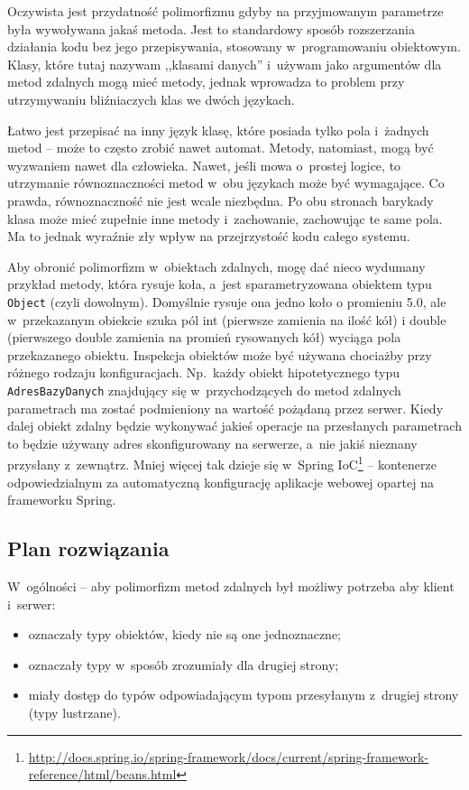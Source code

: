 Oczywista jest przydatność polimorfizmu gdyby na przyjmowanym parametrze była wywoływana jakaś metoda. Jest to standardowy sposób rozszerzania działania kodu bez jego przepisywania, stosowany w~programowaniu obiektowym.
Klasy, które tutaj nazywam ,,klasami danych'' i~używam jako argumentów dla metod zdalnych mogą mieć metody, jednak wprowadza to problem przy utrzymywaniu bliźniaczych klas we dwóch językach.

Łatwo jest przepisać na inny język klasę, które posiada tylko pola i~żadnych metod -- może to często zrobić nawet automat.
Metody, natomiast, mogą być wyzwaniem nawet dla człowieka. Nawet, jeśli mowa o~prostej logice, to utrzymanie równoznaczności metod w~obu językach może być wymagające.
Co prawda, równoznaczność nie jest wcale niezbędna. Po obu stronach barykady klasa może mieć zupełnie inne metody i~zachowanie, zachowując te same pola. Ma to jednak wyraźnie zły wpływ na przejrzystość kodu całego systemu.

Aby obronić polimorfizm w~obiektach zdalnych, mogę dać nieco wydumany przykład metody, która rysuje koła, a~jest sparametryzowana obiektem typu \texttt{Object} (czyli dowolnym). Domyślnie rysuje ona jedno koło o promieniu 5.0, ale w~przekazanym obiekcie szuka pól int (pierwsze zamienia na ilość kół) i double (pierwszego double zamienia na promień rysowanych kół) wyciąga pola przekazanego obiektu.
Inspekcja obiektów może być używana chociażby przy różnego rodzaju konfiguracjach. Np.\ każdy obiekt hipotetycznego typu \texttt{AdresBazyDanych} znajdujący się w~przychodzących do metod zdalnych parametrach ma zostać podmieniony na wartość pożądaną przez serwer. Kiedy dalej obiekt zdalny będzie wykonywać jakieś operacje na przesłanych parametrach to będzie używany adres skonfigurowany na serwerze, a~nie jakiś nieznany przysłany z~zewnątrz.
Mniej więcej tak dzieje się w~Spring IoC\footnote{\url{http://docs.spring.io/spring-framework/docs/current/spring-framework-reference/html/beans.html}} -- kontenerze odpowiedzialnym za automatyczną konfigurację aplikacje webowej opartej na frameworku Spring.

%


\subsection{Plan rozwiązania}
W~ogólności -- aby polimorfizm metod zdalnych był możliwy potrzeba aby klient i~serwer:
\begin{itemize}
	\item oznaczały typy obiektów, kiedy nie są one jednoznaczne;
	\item oznaczały typy w~sposób zrozumiały dla drugiej strony;
	\item miały dostęp do typów odpowiadającym typom przesyłanym z~drugiej strony (typy lustrzane).
\end{itemize}

